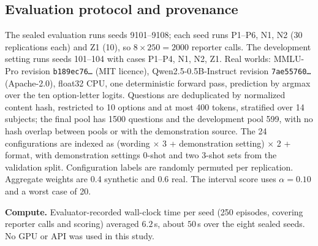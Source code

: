 \documentclass{article}
\begin{document}
\subsection{Evaluation protocol and provenance}
The sealed evaluation runs seeds 9101--9108; each seed runs P1--P6, N1, N2 (30 replications each) and Z1 (10), so $8\times250=2000$ reporter calls. The development setting runs seeds 101--104 with cases P1--P4, N1, N2, Z1. Real worlds: MMLU-Pro revision \texttt{b189ec76\ldots} (MIT licence), Qwen2.5-0.5B-Instruct revision \texttt{7ae55760\ldots} (Apache-2.0), float32 CPU, one deterministic forward pass, prediction by argmax over the ten option-letter logits. Questions are deduplicated by normalized content hash, restricted to 10 options and at most 400 tokens, stratified over 14 subjects; the final pool has 1500 questions and the development pool 599, with no hash overlap between pools or with the demonstration source. The 24 configurations are indexed as (wording $\times$ 3 + demonstration setting) $\times$ 2 + format, with demonstration settings 0-shot and two 3-shot sets from the validation split. Configuration labels are randomly permuted per replication. Aggregate weights are 0.4 synthetic and 0.6 real. The interval score uses $\alpha=0.10$ and a worst case of 20.

\textbf{Compute.} Evaluator-recorded wall-clock time per seed (250 episodes, covering reporter calls and scoring) averaged $6.2$\,s, about $50$\,s over the eight sealed seeds. No GPU or API was used in this study.
\end{document}
